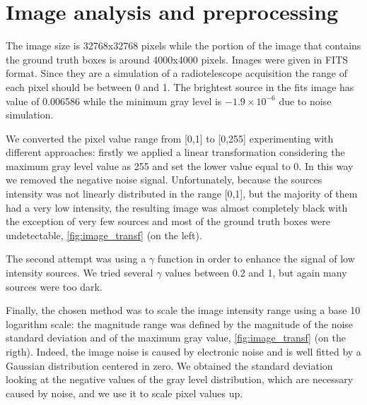 \documentclass[a4paper,10pt]{report}
\begin{document}
\section{Image analysis and preprocessing}
The image size is 32768x32768 pixels while the portion of the image that contains the ground truth boxes is around 4000x4000 pixels.
Images were given in FITS format. Since they are a simulation of a radiotelescope acquisition the range of each pixel should be between 0 and 1.
The brightest source in the fits image has value of 0.006586 while the minimum gray level is  $-1.9 \times 10^{-6}$ due to noise simulation.

We converted the pixel value range from [0,1] to [0,255] experimenting with different approaches: firstly we applied a linear transformation considering the maximum gray level value as 255 and set the lower value equal to 0. In this way we removed the negative noise signal. Unfortunately, because the sources intensity was not linearly distributed in the range [0,1], but the majority of them had a very low intensity, the resulting image was almost completely black with the exception of very few sources and most of the ground truth boxes were undetectable, \ref{fig:image_transf} (on the left).

The second attempt was using a $\gamma$ function in order to enhance the signal of low intensity sources. We tried several $\gamma$ values between 0.2 and 1, but again many sources were too dark.

Finally, the chosen method was to scale the image intensity range using a base 10 logarithm scale: the magnitude range was defined by the magnitude of the noise standard deviation and of the maximum gray value, \ref{fig:image_transf} (on the rigth). Indeed, the image noise is caused by electronic noise and is well fitted by a Gaussian distribution centered in zero. We obtained the standard deviation looking at the negative values of the gray level distribution, which are necessary caused by noise, and we use it to scale pixel values up.
\end{document}
